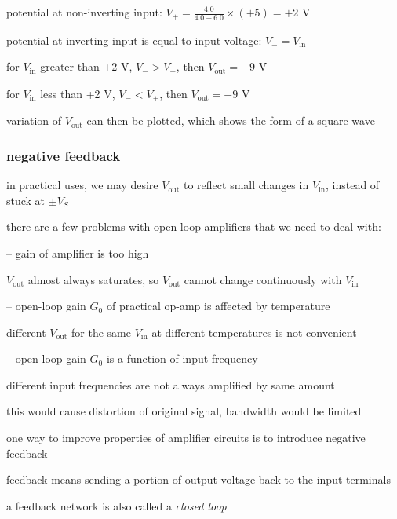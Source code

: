 \sol potential at non-inverting input: $V_+ = \frac{4.0}{4.0+6.0}\times(+5) = +2\text{ V}$

potential at inverting input is equal to input voltage: $V_-=V_\text{in}$

for $V_\text{in}$ greater than +2 V, $V_->V_+$, then $V_\text{out}=-9\text{ V}$

for $V_\text{in}$ less than +2 V, $V_-<V_+$, then $V_\text{out}=+9\text{ V}$

variation of $V_\text{out}$ can then be plotted, which shows the form of a square wave \eoe

\subsubsection{negative feedback}

in practical uses, we may desire $V_\text{out}$ to reflect small changes in $V_\text{in}$, instead of stuck at $\pm V_S$

there are a few problems with open-loop amplifiers that we need to deal with:

\begin{compactitem}
	\item[--] gain of amplifier is too high
	
	$V_\text{out}$ almost always saturates, so $V_\text{out}$ cannot change continuously with $V_\text{in}$
	
	\item[--] open-loop gain $G_0$ of practical op-amp is affected by temperature
	
	different $V_\text{out}$ for the same $V_\text{in}$ at different temperatures is not convenient
	
	\item[--] open-loop gain $G_0$ is a function of input frequency
	
	different input frequencies are not always amplified by same amount
	
	this would cause distortion of original signal, bandwidth would be limited
\end{compactitem}






one way to improve properties of amplifier circuits is to introduce negative feedback

feedback means sending a portion of output voltage back to the input terminals

a feedback network is also called a \emph{closed loop}

